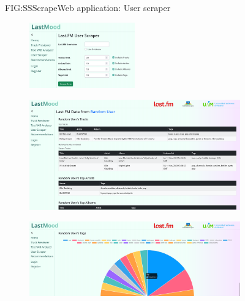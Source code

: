 \begin{figure}[Web application: User scraper]{FIG:SSScrape}{Web application: User scraper}
    \begin{subfigure}[SBFIG:SSScrapeForm]{User scraper form}{\includegraphics[width=0.5\textwidth]{img/SSScrapeForm.png}}
    \end{subfigure}
    \begin{subfigure}[SBFIG:SSScrape1]{Example with limited results}{\includegraphics[width=1\textwidth]{img/SSScrape1.png}}
    \end{subfigure}
    \begin{subfigure}[SBFIG:SSScrape2]{Tag frequency pie chart}{\includegraphics[width=1\textwidth]{img/SSScrape2.png}}
    \end{subfigure}
\end{figure}

